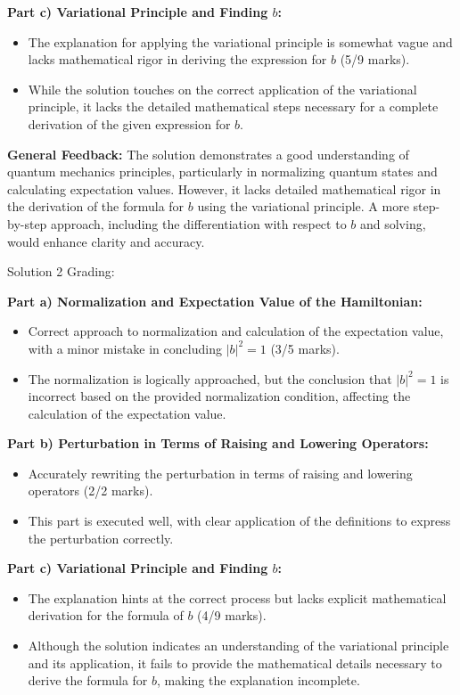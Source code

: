 \documentclass[a4paper,11pt]{article}
\begin{document}
\textbf{Part c) Variational Principle and Finding \( b \):}
\begin{itemize}
    \item The explanation for applying the variational principle is somewhat vague and lacks mathematical rigor in deriving the expression for \( b \) (5/9 marks).
    \item While the solution touches on the correct application of the variational principle, it lacks the detailed mathematical steps necessary for a complete derivation of the given expression for \( b \).
\end{itemize}

\textbf{General Feedback:}
The solution demonstrates a good understanding of quantum mechanics principles, particularly in normalizing quantum states and calculating expectation values. However, it lacks detailed mathematical rigor in the derivation of the formula for \( b \) using the variational principle. A more step-by-step approach, including the differentiation with respect to \( b \) and solving, would enhance clarity and accuracy.

\hrulefill

Solution 2 Grading:

\textbf{Part a) Normalization and Expectation Value of the Hamiltonian:}
\begin{itemize}
    \item Correct approach to normalization and calculation of the expectation value, with a minor mistake in concluding \( |b|^2 = 1 \) (3/5 marks).
    \item The normalization is logically approached, but the conclusion that \( |b|^2 = 1 \) is incorrect based on the provided normalization condition, affecting the calculation of the expectation value.
\end{itemize}

\textbf{Part b) Perturbation in Terms of Raising and Lowering Operators:}
\begin{itemize}
    \item Accurately rewriting the perturbation in terms of raising and lowering operators (2/2 marks).
    \item This part is executed well, with clear application of the definitions to express the perturbation correctly.
\end{itemize}

\textbf{Part c) Variational Principle and Finding \( b \):}
\begin{itemize}
    \item The explanation hints at the correct process but lacks explicit mathematical derivation for the formula of \( b \) (4/9 marks).
    \item Although the solution indicates an understanding of the variational principle and its application, it fails to provide the mathematical details necessary to derive the formula for \( b \), making the explanation incomplete.
\end{itemize}
\end{document}
